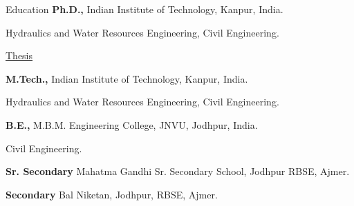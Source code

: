 \begin{rubric}{Education}
    \textbf{Ph.D.,} Indian Institute of Technology, Kanpur, India.
    \par Hydraulics and Water Resources Engineering, Civil Engineering. 
    \par \href{https://drive.google.com/open?id=1lbPIoMuBWmVgrNGMrYiQELlZKM0YnA9X&usp=drive_fs}{Thesis}

    
    \textbf{M.Tech.,} Indian Institute of Technology, Kanpur, India.
    \par Hydraulics and Water Resources Engineering, Civil Engineering.


    \textbf{B.E.,} M.B.M. Engineering College, JNVU, Jodhpur, India.
    \par Civil Engineering.
    
    \textbf{Sr. Secondary} Mahatma Gandhi Sr. Secondary School, Jodhpur RBSE, Ajmer.

    \textbf{Secondary} Bal Niketan, Jodhpur, RBSE, Ajmer.      
\end{rubric}